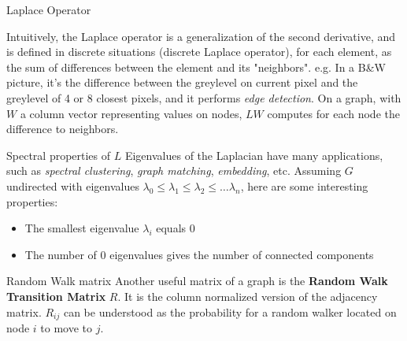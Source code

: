 \documentclass[a4paper,11pt]{book}
\begin{document}
\begin{textbox}{Laplace Operator}

Intuitively, the Laplace operator is a generalization of the second derivative, and is defined in discrete situations (discrete Laplace operator), for each element, as the sum of differences between the element and its "neighbors". e.g. In a B\&W picture, it's the difference between the greylevel on current pixel and the greylevel of 4 or 8 closest pixels, and it performs \textit{edge detection}. On a graph, with $W$ a column vector representing values on nodes, $LW$ computes for each node the difference to neighbors. 
\end{textbox}




\begin{textbox}{Spectral properties of $L$}
Eigenvalues of the Laplacian have many applications, such as \textit{spectral clustering}, \textit{graph matching}, \textit{embedding}, etc. Assuming $G$ undirected with eigenvalues $\lambda_0 \leq \lambda_1 \leq \lambda_2 \leq \dots \lambda_n$, here are some interesting properties:

\begin{itemize}
    \item The smallest eigenvalue $\lambda_i$ equals 0
    \item The number of 0 eigenvalues gives the number of connected components
\end{itemize}

\end{textbox}


\begin{textbox}{Random Walk matrix}
Another useful matrix of a graph is the \textbf{Random Walk Transition Matrix} $R$. It is the column normalized version of the adjacency matrix. $R_{ij}$ can be understood as the probability for a random walker located on node $i$ to move to $j$.

\end{textbox}
\end{document}
